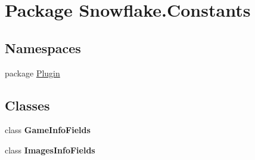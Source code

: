 \hypertarget{namespace_snowflake_1_1_constants}{}\section{Package Snowflake.\+Constants}
\label{namespace_snowflake_1_1_constants}
\subsection*{Namespaces}
\begin{DoxyCompactItemize}
\item 
package \hyperlink{namespace_snowflake_1_1_constants_1_1_plugin}{Plugin}
\end{DoxyCompactItemize}
\subsection*{Classes}
\begin{DoxyCompactItemize}
\item 
class {\bfseries Game\+Info\+Fields}
\item 
class {\bfseries Images\+Info\+Fields}
\end{DoxyCompactItemize}
